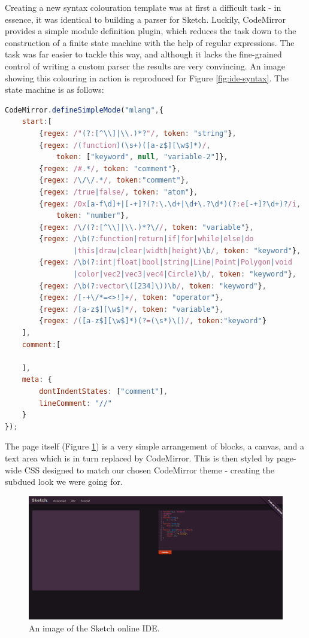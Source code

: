 \documentclass{l3proj}
\begin{document}
Creating a new syntax colouration template was at first a difficult task - in essence, it was identical to building a parser for Sketch. Luckily, CodeMirror provides a simple module definition plugin, which reduces the task down to the construction of a finite state machine with the help of regular expressions. The task was far easier to tackle this way, and although it lacks the fine-grained control of writing a custom parser the results are very convincing. An image showing this colouring in action is reproduced for Figure \ref{fig:ide-syntax}. The state machine is as follows:
\begin{lstlisting}[caption={Syntax Highlighting State Machine},label={lst:ide-fsm},language=JavaScript]
CodeMirror.defineSimpleMode("mlang",{
    start:[
        {regex: /"(?:[^\\]|\\.)*?"/, token: "string"},
		{regex: /(function)(\s+)([a-z$][\w$]*)/,
			token: ["keyword", null, "variable-2"]},
		{regex: /#.*/, token: "comment"},
		{regex: /\/\/.*/, token:"comment"},
		{regex: /true|false/, token: "atom"},
		{regex: /0x[a-f\d]+|[-+]?(?:\.\d+|\d+\.?\d*)(?:e[-+]?\d+)?/i,
			token: "number"},
		{regex: /\/(?:[^\\]|\\.)*?\//, token: "variable"},
		{regex: /\b(?:function|return|if|for|while|else|do
				|this|draw|clear|width|height)\b/, token: "keyword"},
		{regex: /\b(?:int|float|bool|string|Line|Point|Polygon|void
				|color|vec2|vec3|vec4|Circle)\b/, token: "keyword"},
		{regex: /\b(?:vector\([234]\))\b/, token: "keyword"},
		{regex: /[-+\/*=<>!]+/, token: "operator"},
		{regex: /[a-z$][\w$]*/, token: "variable"},
		{regex: /([a-z$][\w$]*)(?=(\s*)\()/, token:"keyword"}
    ],
    comment:[

    ],
    meta: {
        dontIndentStates: ["comment"],
        lineComment: "//"
    }
});
\end{lstlisting}

The page itself (Figure \ref{fig:ide-full}) is a very simple arrangement of blocks, a canvas, and a text area which is in turn replaced by CodeMirror. This is then styled by page-wide CSS designed to match our chosen CodeMirror theme - creating the subdued look we were going for.

\begin{figure}[!h]
\centering
\includegraphics[width=\textwidth]{images/sketch-ide}
\caption{An image of the Sketch online IDE.}
\label{fig:ide-full}
\end{figure}
\end{document}
